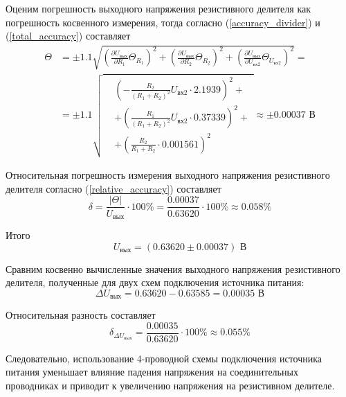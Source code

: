 \documentclass[12pt,a4paper]{article}
\begin{document}
Оценим погрешность выходного напряжения резистивного делителя как погрешность косвенного 
измерения, тогда согласно (\ref{accuracy_divider}) и (\ref{total_accuracy}) составляет
\begin{equation*}
\begin{aligned}
\Theta &= \pm 1.1\sqrt{
\left(\frac{\partial U_{\text{вых}}}{\partial R_1} \Theta_{R_1}\right)^2
+ \left(\frac{\partial U_{\text{вых}}}{\partial R_2} \Theta_{R_2}\right)^2 
+ \left(\frac{\partial U_{\text{вых}}}{\partial U_{\text{вх2}}} \Theta_{U_{\text{вх2}}}\right)^2
} = \\
	   &= \pm 1.1\sqrt{
	   \begin{aligned}
	   &\left(-\frac{R_2}{(R_1 + R_2)^2} U_{\text{вх2}} \cdot 2.1939\right)^2    + \\
	   &+ \left(\frac{R_1}{(R_1 + R_2)^2} U_{\text{вх2}} \cdot 0.37339\right)^2 + \\
	   &+ \left(\frac{R_2}{R_1 + R_2} \cdot 0.001561\right)^2
	   \end{aligned}
} \approx \pm 0.00037 \text{ В}
\end{aligned}
\end{equation*}

Относительная погрешность измерения выходного напряжения резистивного делителя согласно (\ref{relative_accuracy}) составляет
\begin{equation*}
\delta = \frac{\left|\Theta\right|}{U_{\text{вых}}} \cdot 100\% = \frac{0.00037}{0.63620} \cdot 100\% \approx 0.058\%
\end{equation*}

Итого
\begin{equation*}
U_{\text{вых}} = (0.63620 \pm 0.00037) \text{ В}
\end{equation*}

Сравним косвенно вычисленные значения выходного напряжения резистивного делителя,
полученные для двух схем подключения источника питания:
\begin{equation*}
\Delta U_{\text{вых}} = 0.63620 - 0.63585 = 0.00035 \text{ В}
\end{equation*}

Относительная разность составляет
\begin{equation*}
\delta_{\Delta U_{\text{вых}}} = \frac{0.00035}{0.63620} \cdot 100\% \approx 0.055\%
\end{equation*}

Следовательно, использование 4-проводной схемы подключения источника питания уменьшает
влияние падения напряжения на соединительных проводниках и приводит к увеличению
напряжения на резистивном делителе.
\end{document}
